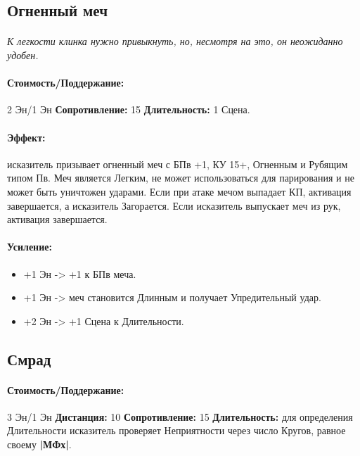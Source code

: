 \begin{itemize}
\begin{itemize}
\subsection{Огненный меч}
\paragraph{} 
\textit{К легкости клинка нужно привыкнуть, но, несмотря на это, он неожиданно удобен.}
\paragraph{Стоимость/Поддержание: }2 Эн/1 Эн
\newline
\textbf{Сопротивление: }15
\newline 
\textbf{Длительность: }1 Сцена.
\paragraph{Эффект: }исказитель призывает огненный меч с БПв +1, КУ 15+, Огненным и Рубящим типом Пв. Меч является Легким, не может использоваться для парирования и не может быть уничтожен ударами. Если при атаке мечом выпадает КП, активация завершается, а исказитель Загорается. 
\newline Если исказитель выпускает меч из рук, активация завершается.
\paragraph{Усиление:}
\begin{itemize}
\item+1 Эн -> +1 к БПв меча.
\item+1 Эн -> меч становится Длинным и получает Упредительный удар.
\item+2 Эн -> +1 Сцена к Длительности.
\end{itemize}
\subsection{Смрад}
\paragraph{} 
\textit{
\tbd}
\paragraph{Стоимость/Поддержание: }3 Эн/1 Эн
\newline
\textbf{Дистанция: }10
\newline
\textbf{Сопротивление: }15
\newline 
\textbf{Длительность: }для определения Длительности исказитель проверяет Неприятности через число Кругов, равное своему 
\textbf{|МФх|}. 
\tbd

\end{itemize}
\end{itemize}
